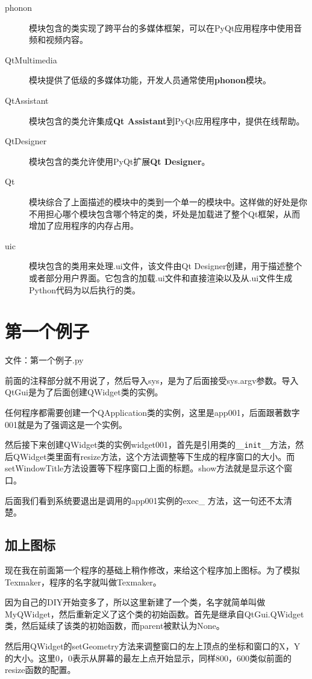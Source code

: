 \documentclass[12pt,oneside]{book}
\begin{document}
\begin{common-format}
\begin{description}
\item[phonon] 模块包含的类实现了跨平台的多媒体框架，可以在PyQt应用程序中使用音频和视频内容。
\item[QtMultimedia] 模块提供了低级的多媒体功能，开发人员通常使用\textbf{phonon}模块。
\item[QtAssistant] 模块包含的类允许集成\textbf{Qt Assistant}到PyQt应用程序中，提供在线帮助。
\item[QtDesigner] 模块包含的类允许使用PyQt扩展\textbf{Qt Designer}。
\item[Qt] 模块综合了上面描述的模块中的类到一个单一的模块中。这样做的好处是你不用担心哪个模块包含哪个特定的类，坏处是加载进了整个Qt框架，从而增加了应用程序的内存占用。
\item[uic] 模块包含的类用来处理.ui文件，该文件由Qt Designer创建，用于描述整个或者部分用户界面。它包含的加载.ui文件和直接渲染以及从.ui文件生成Python代码为以后执行的类。
\end{description}


\section{第一个例子}
文件：第一个例子.py

前面的注释部分就不用说了，然后导入sys，是为了后面接受sys.argv参数。导入QtGui是为了后面创建QWidget类的实例。

任何程序都需要创建一个QApplication类的实例，这里是app001，后面跟著数字001就是为了强调这是一个实例。

然后接下来创建QWidget类的实例widget001，首先是引用类的\verb+__init__+方法，然后QWidget类里面有resize方法，这个方法调整等下生成的程序窗口的大小。而setWindowTitle方法设置等下程序窗口上面的标题。show方法就是显示这个窗口。

后面我们看到系统要退出是调用的app001实例的exec\_ 方法，这一句还不太清楚。


\subsection{加上图标}
现在我在前面第一个程序的基础上稍作修改，来给这个程序加上图标。为了模拟Texmaker，程序的名字就叫做Texmaker。

因为自己的DIY开始变多了，所以这里新建了一个类，名字就简单叫做MyQWidget，然后重新定义了这个类的初始函数。首先是继承自QtGui.QWidget类，然后延续了该类的初始函数，而parent被默认为None。

然后用QWidget的setGeometry方法来调整窗口的左上顶点的坐标和窗口的X，Y的大小。这里0，0表示从屏幕的最左上点开始显示，同样800，600类似前面的resize函数的配置。


\end{common-format}
\end{document}
